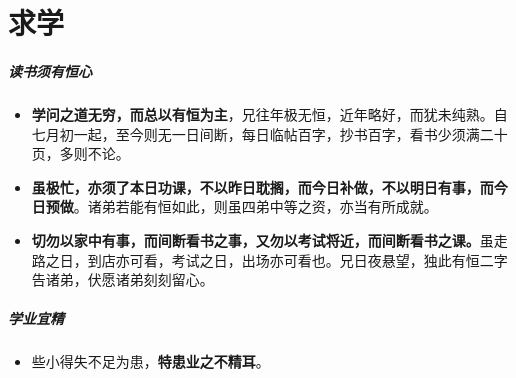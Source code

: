 \documentclass[UTF8,a4paper,8pt]{ctexbook}
\begin{document}
\chapter{求学}
	\paragraph{读书须有恒心}
		\begin{itemize}
			\item \textbf{学问之道无穷，而总以有恒为主}，兄往年极无恒，近年略好，而犹未纯熟。自七月初一起，至今则无一日间断，每日临帖百字，抄书百字，看书少须满二十页，多则不论。
		
			\item \textbf{虽极忙，亦须了本日功课，不以昨日耽搁，而今日补做，不以明日有事，而今日预做}。诸弟若能有恒如此，则虽四弟中等之资，亦当有所成就。
		
			\item \textbf{切勿以家中有事，而间断看书之事，又勿以考试将近，而间断看书之课。}虽走路之日，到店亦可看，考试之日，出场亦可看也。兄日夜悬望，独此有恒二字告诸弟，伏愿诸弟刻刻留心。
		\end{itemize}
	\paragraph{学业宜精}
		\begin{itemize}
			\item 些小得失不足为患，\textbf{特患业之不精耳}。
		\end{itemize}
		
\end{document}
